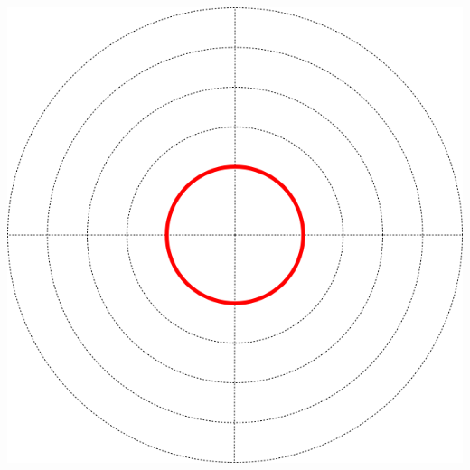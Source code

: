 \documentclass[paper=a4, fleqn]{scrartcl}
\begin{document}
\begin{titlepage}
\includegraphics[scale=0.6]{polar_uc_plot.png}

\end{titlepage}
\end{document}
